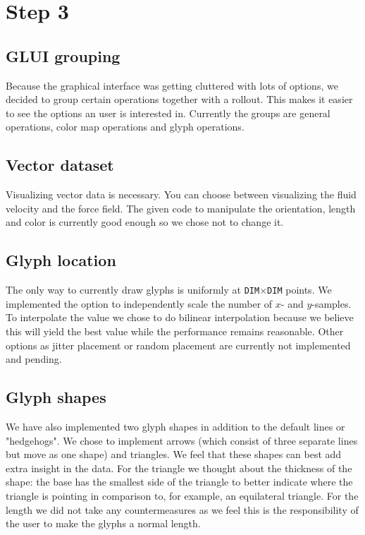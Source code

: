 \section*{Step 3}
 \subsection*{GLUI grouping}
 Because the graphical interface was getting cluttered with lots of options, we decided to group certain operations together with a rollout. This makes it easier to see the options an user is interested in. Currently the groups are general operations, color map operations and glyph operations.
 \subsection*{Vector dataset}
 Visualizing vector data is necessary. You can choose between visualizing the fluid velocity and the force field. The given code to manipulate the orientation, length and color is currently good enough so we chose not to change it. 
 \subsection*{Glyph location}
 The only way to currently draw glyphs is uniformly at \texttt{DIM}$\times$\texttt{DIM} points. We implemented the option to independently scale the number of $x$- and $y$-samples. To interpolate the value we chose to do bilinear interpolation because we believe this will yield the best value while the performance remains reasonable. Other options as jitter placement or random placement are currently not implemented and pending. 
 \subsection*{Glyph shapes}
 We have also implemented two glyph shapes in addition to the default lines or "hedgehogs". We chose to implement arrows (which consist of three separate lines but move as one shape) and triangles. We feel that these shapes can best add extra insight in the data. For the triangle we thought about the thickness of the shape: the base has the smallest side of the triangle to better indicate where the triangle is pointing in comparison to, for example, an equilateral triangle. For the length we did not take any countermeasures as we feel this is the responsibility of the user to make the glyphs a normal length. 
